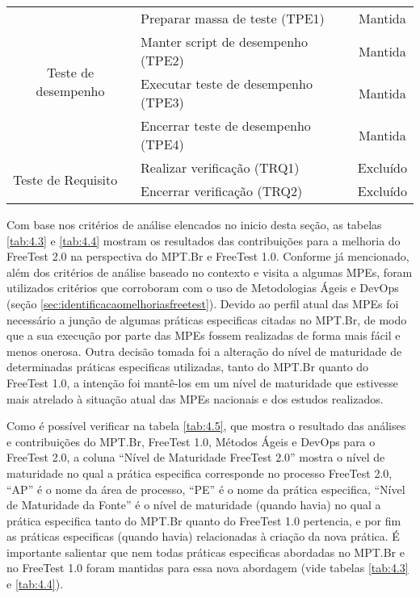 \begin{table}[H]
\begin{tabular}{|c|l|c|}
\multirow{4}{*}{Teste de desempenho}                      & Preparar massa de teste (TPE1)                   & Mantida                       \\ \cline{2-3} 
                                                          & Manter script de desempenho (TPE2)               & Mantida                       \\ \cline{2-3} 
                                                          & Executar teste de desempenho (TPE3)              & Mantida                       \\ \cline{2-3} 
                                                          & Encerrar teste de desempenho (TPE4)              & Mantida                       \\ \hline
\multicolumn{1}{|l|}{\multirow{2}{*}{Teste de Requisito}} & Realizar verificação (TRQ1)                      & \multicolumn{1}{l|}{Excluído} \\ \cline{2-3} 
\multicolumn{1}{|l|}{}                                    & Encerrar verificação (TRQ2)                      & \multicolumn{1}{l|}{Excluído} \\ \hline
\end{tabular}
\end{table}

Com base nos critérios de análise elencados no inicio desta seção, as tabelas \ref{tab:4.3} e \ref{tab:4.4} mostram os resultados das contribuições para a melhoria do FreeTest 2.0 na perspectiva do MPT.Br e FreeTest 1.0. Conforme já mencionado, além dos critérios de análise baseado no contexto e visita a algumas MPEs, foram utilizados critérios que corroboram com o uso de Metodologias Ágeis e DevOps (seção \ref{sec:identificacaomelhoriasfreetest}). Devido ao perfil atual das MPEs foi necessário a junção de algumas práticas especificas citadas no MPT.Br, de modo que a sua execução por parte das MPEs fossem realizadas de forma mais fácil e menos onerosa. Outra decisão tomada foi a alteração do nível de maturidade de determinadas práticas especificas utilizadas, tanto do MPT.Br quanto do FreeTest 1.0, a intenção foi mantê-los em um nível de maturidade que estivesse mais atrelado à situação atual das MPEs nacionais \cite{Especialistas2015, SilvaDias2015} e dos estudos realizados.

Como é possível verificar na tabela \ref{tab:4.5}, que mostra o resultado das análises e contribuições do MPT.Br, FreeTest 1.0, Métodos Ágeis e DevOps para o FreeTest 2.0, a coluna “Nível de Maturidade FreeTest 2.0” mostra o nível de maturidade no qual a prática especifica corresponde no processo FreeTest 2.0, “AP” é o nome da área de processo, “PE” é o nome da prática especifica, “Nível de Maturidade da Fonte” é o nível de maturidade (quando havia) no qual a prática especifica tanto do MPT.Br quanto do FreeTest 1.0 pertencia, e por fim as práticas especificas (quando havia) relacionadas à criação da nova prática. É importante salientar que nem todas práticas especificas abordadas no MPT.Br e no FreeTest 1.0 foram mantidas para essa nova abordagem (vide tabelas \ref{tab:4.3} e \ref{tab:4.4}).


